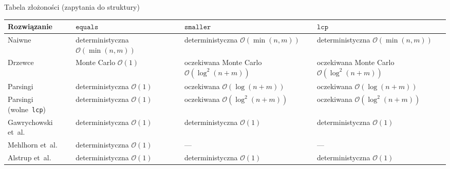 \documentclass[polish]{beamer}
\begin{document}
\begin{frame}{Tabela złożoności (zapytania do struktury)}
    \begin{lrbox}{\secondbox}
        \begin{tabular}{ | m{3.5cm} | >{\centering\arraybackslash}m{2.8cm} | >{\centering\arraybackslash}m{2.8cm} | >{\centering\arraybackslash}m{2.8cm} | }
            \hline
            Rozwiązanie & $\texttt{equals}$ & $\texttt{smaller}$ & $\texttt{lcp}$ \\
            \hline
            Naiwne & deterministyczna $\mathcal{O}(\min(n, m))$ & deterministyczna $\mathcal{O}(\min(n, m))$ & deterministyczna $\mathcal{O}(\min(n, m))$ \\
            \hline
            Drzewce & Monte Carlo $\mathcal{O}(1)$ & oczekiwana Monte Carlo $\mathcal{O}(\log^2(n + m))$ & oczekiwana Monte Carlo $\mathcal{O}(\log^2(n + m))$ \\
            \hline
            Parsingi & deterministyczna $\mathcal{O}(1)$ & oczekiwana $\mathcal{O}(\log(n + m))$ & oczekiwana $\mathcal{O}(\log(n + m))$ \\
            \hline
            Parsingi (wolne~\texttt{lcp}) & deterministyczna $\mathcal{O}(1)$ & oczekiwana $\mathcal{O}(\log^2(n + m))$ & oczekiwana $\mathcal{O}(\log^2(n + m))$ \\
            \hline
            Gawrychowski et~al. & deterministyczna $\mathcal{O}(1)$ & deterministyczna $\mathcal{O}(1)$ & deterministyczna $\mathcal{O}(1)$ \\
            \hline
            Mehlhorn et~al. & deterministyczna $\mathcal{O}(1)$ & --- & ---\\
            \hline
            Alstrup et~al. & deterministyczna $\mathcal{O}(1)$ & deterministyczna $\mathcal{O}(1)$ & deterministyczna $\mathcal{O}(1)$ \\
            \hline
        \end{tabular}
    \end{lrbox}
    \begin{center}
        \scalebox{0.8}{\usebox{\secondbox}}
    \end{center}
\end{frame}

\newsavebox{\thirdbox}
\end{document}
